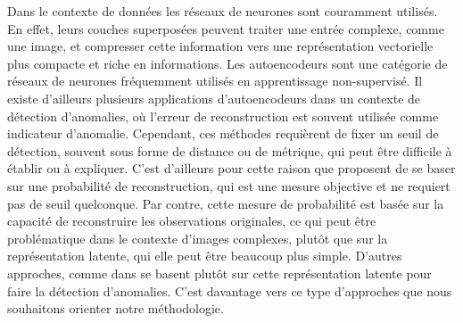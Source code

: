 Dans le contexte de données \DIFdelbegin {}\DIFdelend \DIFaddbegin {}\DIFaddend les réseaux de neurones sont couramment utilisés. En effet, leurs couches superposées peuvent traiter une entrée complexe, comme une image, et compresser cette information vers une représentation vectorielle plus compacte et riche en informations. \DIFaddbegin {}\textit{} \DIFaddend Les autoencodeurs sont \DIFaddbegin {}\DIFaddend une catégorie de réseaux de neurones fréquemment utilisés en apprentissage non-supervisé. Il existe d'ailleurs plusieurs applications d'autoencodeurs dans un contexte de détection d'anomalies, où l'erreur de reconstruction est souvent utilisée comme indicateur d'anomalie. Cependant, ces méthodes requièrent de fixer un seuil de détection, souvent sous forme de distance ou de métrique, qui peut être difficile à établir ou à expliquer. C'est d'ailleurs pour cette raison que  \cite{An2015VariationalAB} proposent de se baser sur une probabilité de reconstruction, qui est une mesure objective et ne requiert pas de seuil quelconque. Par contre, cette mesure de probabilité est basée sur la capacité de reconstruire les observations originales, ce qui peut être problématique dans le contexte d'images complexes, plutôt que sur la représentation latente, qui elle peut être beaucoup plus simple. D'autres approches, comme dans \DIFdelbegin {}\DIFdelend \DIFaddbegin {}\DIFaddend se basent plutôt sur cette représentation latente pour faire la détection d'anomalies. C'est davantage vers ce type d'approches que nous souhaitons orienter notre méthodologie\DIFaddbegin {}\DIFaddend .

